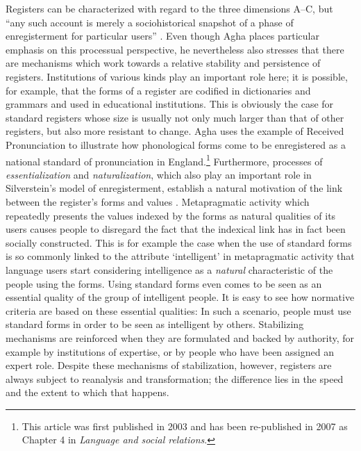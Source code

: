 \largerpage
Registers can be characterized with regard to the three dimensions A--C, but “any such account is merely a sociohistorical snapshot of a phase of enregisterment for particular users” \citep[170]{Agha2007}. Even though Agha places particular emphasis on this processual perspective, he nevertheless also stresses that there are mechanisms which work towards a relative stability and persistence of registers. Institutions of various kinds play an important role here; it is possible, for example, that the forms of a register are codified in dictionaries and grammars and used in educational institutions. This is obviously the case for standard registers whose size is usually not only much larger than that of other registers, but also more resistant to change. Agha uses the example of Received Pronunciation to illustrate how phonological forms come to be enregistered as a national standard of pronunciation in England.\footnote{This article was first published in 2003 and has been re-published in 2007 as Chapter 4 in \emph{Language and social relations}.} Furthermore, processes of \textit{essentialization} and \textit{naturalization}, which also play an important role in Silverstein’s model of enregisterment, establish a natural motivation of the link between the register’s forms and values \citep[74]{Agha2007}. Metapragmatic activity which repeatedly presents the values indexed by the forms as natural qualities of its users causes people to disregard the fact that the indexical link has in fact been socially constructed. This is for example the case when the use of standard forms is so commonly linked to the attribute ‘intelligent’ in metapragmatic activity that language users start considering intelligence as a \emph{natural} characteristic of the people using the forms. Using standard forms even comes to be seen as an essential quality of the group of intelligent people. It is easy to see how normative criteria are based on these essential qualities: In such a scenario, people must use standard forms in order to be seen as intelligent by others. Stabilizing mechanisms are reinforced when they are formulated and backed by authority, for example by institutions of expertise, or by people who have been assigned an expert role. Despite these mechanisms of stabilization, however, registers are always subject to reanalysis and transformation; the difference lies in the speed and the extent to which that happens.


